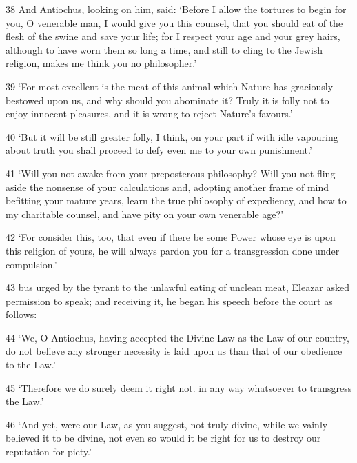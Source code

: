 \par 38 And Antiochus, looking on him, said: ‘Before I allow the tortures to begin for you, O venerable man, I would give you this counsel, that you should eat of the flesh of the swine and save your life; for I respect your age and your grey hairs, although to have worn them so long a time, and still to cling to the Jewish religion, makes me think you no philosopher.’

\par 39 ‘For most excellent is the meat of this animal which Nature has graciously bestowed upon us, and why should you abominate it? Truly it is folly not to enjoy innocent pleasures, and it is wrong to reject Nature's favours.’

\par 40 ‘But it will be still greater folly, I think, on your part if with idle vapouring about truth you shall proceed to defy even me to your own punishment.’

\par 41 ‘Will you not awake from your preposterous philosophy? Will you not fling aside the nonsense of your calculations and, adopting another frame of mind befitting your mature years, learn the true philosophy of expediency, and how to my charitable counsel, and have pity on your own venerable age?’

\par 42 ‘For consider this, too, that even if there be some Power whose eye is upon this religion of yours, he will always pardon you for a transgression done under compulsion.’

\par 43 bus urged by the tyrant to the unlawful eating of unclean meat, Eleazar asked permission to speak; and receiving it, he began his speech before the court as follows:

\par 44 ‘We, O Antiochus, having accepted the Divine Law as the Law of our country, do not believe any stronger necessity is laid upon us than that of our obedience to the Law.’

\par 45 ‘Therefore we do surely deem it right not. in any way whatsoever to transgress the Law.’

\par 46 ‘And yet, were our Law, as you suggest, not truly divine, while we vainly believed it to be divine, not even so would it be right for us to destroy our reputation for piety.’

